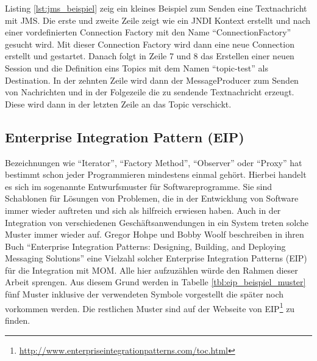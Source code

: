 Listing \ref{lst:jms_beispiel} zeig ein kleines Beispiel zum Senden eine Textnachricht mit JMS. Die erste und zweite Zeile zeigt wie ein JNDI Kontext erstellt und nach einer vordefinierten Connection Factory mit den Name \enquote{ConnectionFactory} gesucht wird. Mit dieser Connection Factory wird dann eine neue Connection erstellt und gestartet. Danach folgt in Zeile 7 und 8 das Erstellen einer neuen Session und die Definition eins Topics mit dem Namen \enquote{topic-test} als Destination. In der zehnten Zeile wird dann der MessageProducer zum Senden von Nachrichten und in der Folgezeile die zu sendende Textnachricht erzeugt. Diese wird dann in der letzten Zeile an das Topic verschickt.


\subsection{Enterprise Integration Pattern (EIP)} %
\label{sub:enterprise_integration_pattern}

Bezeichnungen wie \enquote{Iterator}, \enquote{Factory Method}, \enquote{Observer} oder \enquote{Proxy} hat bestimmt schon jeder Programmieren mindestens einmal gehört. Hierbei handelt es sich im sogenannte Entwurfsmuster für Softwareprogramme. Sie sind Schablonen für Lösungen von Problemen, die in der Entwicklung von Software immer wieder auftreten und sich als hilfreich erwiesen haben. Auch in der Integration von verschiedenen Geschäftsanwendungen in ein System treten solche Muster immer wieder auf. Gregor Hohpe und Bobby Woolf beschreiben in ihren Buch \enquote{Enterprise Integration Patterns: Designing, Building, and Deploying Messaging Solutions}\cite{Hohpe:2003:EIP:940308} eine Vielzahl solcher Enterprise Integration Patterns (EIP) für die Integration mit MOM. Alle hier aufzuzählen würde den Rahmen dieser Arbeit sprengen. Aus diesem Grund werden in Tabelle \ref{tbl:eip_beispiel_muster} fünf Muster inklusive der verwendeten Symbole vorgestellt die später noch vorkommen werden. Die restlichen Muster sind auf der Webseite von EIP\footnote{\url{http://www.enterpriseintegrationpatterns.com/toc.html}} zu finden.


